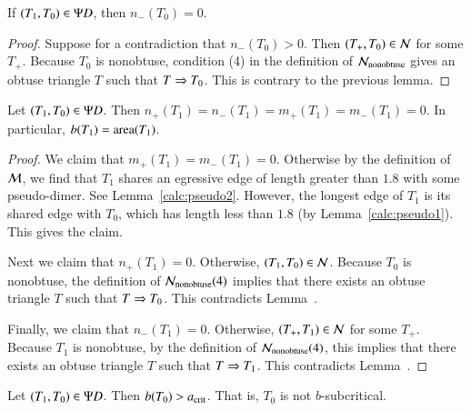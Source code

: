 \begin{corollary}
If $(T_1,T_0)\in\Psi D$, then $n_-(T_0)=0$.
\end{corollary}

\begin{proof} 
  Suppose for a contradiction that $n_-(T_0)>0$.  Then $(T_+,T_0)\in
  \mathcal N$ for some $T_+$.  Because $T_0$ is nonobtuse,
  condition (4) in the definition of $\mathcal N_{\text{nonobtuse}}$
  gives an obtuse triangle $T$ such that $T\Rightarrow T_0$.  This is contrary to the
  previous lemma.
\end{proof}

\begin{lemma} 
  Let $(T_1,T_0)\in\Psi D$.  Then
  $n_+(T_1)=n_-(T_1)=m_+(T_1)=m_-(T_1)=0$.  In particular, $b(T_1) =
  {\operatorname{area}}(T_1)$.
\end{lemma}

\begin{proof}  
  We claim that $m_+(T_1)=m_-(T_1)=0$.  Otherwise by the definition of $\mathcal M$, we find that $T_1$ shares an
  egressive edge of length greater than $1.8$ with some pseudo-dimer. See Lemma~\ref{calc:pseudo2}.
  However, the longest edge of $T_1$ is its shared edge with $T_0$,
  which has length less than $1.8$ (by Lemma~\ref{calc:pseudo1}).  This gives the claim.

  Next we claim that $n_+(T_1)=0$.  Otherwise, $(T_1,T_0)\in \mathcal N$.
  Because $T_0$ is nonobtuse, the definition of $\mathcal N_{\text{nonobtuse}}(4)$
  implies that there exists an obtuse
  triangle $T$ such that $T\Rightarrow T_0$.  This contradicts
  Lemma~.

  Finally, we claim that $n_-(T_1)=0$.  Otherwise, $(T_+,T_1)\in \mathcal N$ for
  some $T_+$.  Because $T_1$ is nonobtuse, by the definition of $\mathcal N_{\text{nonobtuse}}(4)$, this implies that there exists
  an obtuse triangle $T$ such that $T\Rightarrow T_1$.  This contradicts
  Lemma~.
\end{proof}

\begin{lemma}  
  Let $(T_1,T_0)\in\Psi D$.  Then $b(T_0) > a_\text{crit}$.  That is, $T_0$ is
  not $b$-subcritical.
\end{lemma}

